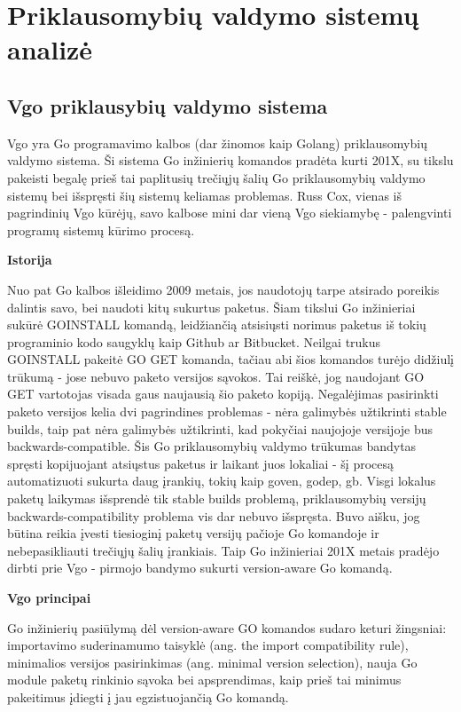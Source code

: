 \section{Priklausomybių valdymo sistemų analizė}

\subsection{Vgo priklausybių valdymo sistema}

Vgo yra Go programavimo kalbos (dar žinomos kaip Golang) priklausomybių valdymo sistema. Ši sistema Go inžinierių komandos pradėta kurti 201X, su tikslu pakeisti begalę prieš tai paplitusių trečiųjų šalių Go priklausomybių valdymo sistemų bei išspręsti šių sistemų keliamas problemas. Russ Cox, vienas iš pagrindinių Vgo kūrėjų, savo kalbose mini dar vieną Vgo siekiamybę - palengvinti programų sistemų kūrimo procesą.

\bigbreak
{\bf Istorija}
\bigbreak

Nuo pat Go kalbos išleidimo 2009 metais, jos naudotojų tarpe atsirado poreikis dalintis savo, bei naudoti kitų sukurtus paketus. Šiam tikslui Go inžinieriai sukūrė GOINSTALL komandą, leidžiančią atsisiųsti norimus paketus iš tokių programinio kodo saugyklų kaip Github ar Bitbucket. Neilgai trukus GOINSTALL pakeitė GO GET komanda, tačiau abi šios komandos turėjo didžiulį trūkumą - jose nebuvo paketo versijos sąvokos. Tai reiškė, jog naudojant GO GET vartotojas visada gaus naujausią šio paketo kopiją. Negalėjimas pasirinkti paketo versijos kelia dvi pagrindines problemas - nėra galimybės užtikrinti stable builds, taip pat nėra galimybės užtikrinti, kad pokyčiai naujojoje versijoje bus backwards-compatible. Šis Go priklausomybių valdymo trūkumas bandytas spręsti kopijuojant atsiųstus paketus ir laikant juos lokaliai - šį procesą automatizuoti sukurta daug įrankių, tokių kaip goven, godep, gb. Visgi lokalus paketų laikymas išsprendė tik stable builds problemą, priklausomybių versijų backwards-compatibility problema vis dar nebuvo išspręsta. Buvo aišku, jog būtina reikia įvesti tiesioginį paketų versijų pačioje Go komandoje ir nebepasikliauti trečiųjų šalių įrankiais. Taip Go inžinieriai 201X metais pradėjo dirbti prie Vgo - pirmojo bandymo sukurti version-aware Go komandą.

\bigbreak
{\bf Vgo principai}
\bigbreak

Go inžinierių pasiūlymą dėl version-aware GO komandos sudaro keturi žingsniai: importavimo suderinamumo taisyklė (ang. the import compatibility rule), minimalios versijos pasirinkimas (ang. minimal version selection), nauja Go module paketų rinkinio sąvoka bei  apsprendimas, kaip prieš tai minimus pakeitimus įdiegti į jau egzistuojančią Go komandą.

